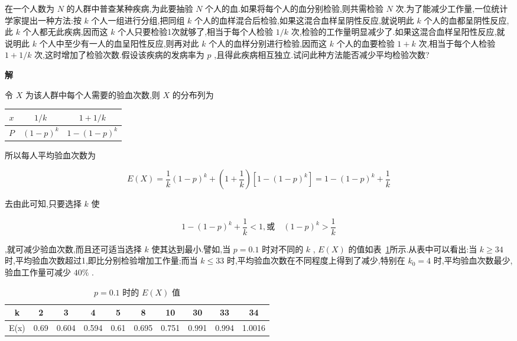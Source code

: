 \begin{example}\label{exam:2.2.2}
	在一个人数为 $ N $ 的人群中普查某种疾病,为此要抽验 $ N $ 个人的血.如果将每个人的血分别检验,则共需检验 $ N $ 次.为了能减少工作量,一位统计学家提出一种方法:按 $ k $ 个人一组进行分组,把同组 $ k $ 个人的血样混合后检验,如果这混合血样呈阴性反应,就说明此 $ k $ 个人的血都呈阴性反应,此 $ k $ 个人都无此疾病,因而这 $ k $ 个人只要检验1次就够了,相当于每个人检验 $ 1/k $ 次,检验的工作量明显减少了.如果这混合血样呈阳性反应,就说明此 $ k $ 个人中至少有一人的血呈阳性反应,则再对此 $ k $ 个人的血样分别进行检验,因而这 $ k $ 个人的血要检验 $ 1+k $ 次,相当于每个人检验 $ 1+1/k $ 次,这时增加了检验次数.假设该疾病的发病率为 $ p $ ,且得此疾病相互独立.试问此种方法能否减少平均检验次数?
	
	\textbf{解}
	
	令 $ X $ 为该人群中每个人需要的验血次数,则 $ X $ 的分布列为
	
	\begin{table}[htbp]
		\centering
		\begin{tabular}{c|cc}
			 $ x $ 	& $ 1 / k $ & $ 1+1 / k $ \\\midrule
			 $ P $ 	& $ (1-p)^{k} $ & $ 1-(1-p)^{k} $ \\
		\end{tabular}%
	\end{table}%
	
\end{example}

所以每人平均验血次数为

\[ 
E(X)=\frac{1}{k}(1-p)^{k}+\left(1+\frac{1}{k}\right)\left[1-(1-p)^{k}\right]=1-(1-p)^{k}+\frac{1}{k}
\]

去由此可知,只要选择 $ k $ 使

\[ 
1-(1-p)^{k}+\frac{1}{k}<1, \text{或} \quad(1-p)^{k}>\frac{1}{k}
\]

,就可减少验血次数,而且还可适当选择 $ k $ 使其达到最小.譬如,当 $ p=0.1 $ 时对不同的 $ k $ , $ E(X) $ 的值如表~\ref{tab:2.21}所示.从表中可以看出:当 $ k \geqslant 34 $ 时,平均验血次数超过1,即比分别检验增加工作量;而当 $ k \leqslant 33 $ 时,平均验血次数在不同程度上得到了减少,特别在 $ k_{0}=4 $ 时,平均验血次数最少,验血工作量可减少 $ 40\% $ .

\begin{table}[htbp]
	\centering
	\caption{ $ p=0.1 $ 时的 $ E(X) $ 值}
	\begin{tabular}{c|ccccccccc}
		\toprule
		k     & 2     & 3     & 4     & 5     & 8     & 10    & 30    & 33    & 34 \\\midrule
		E(x)  & 0.69  & 0.604 & 0.594 & 0.61  & 0.695 & 0.751 & 0.991 & 0.994 & 1.0016 \\\bottomrule
	\end{tabular}%
	\label{tab:2.21}%
\end{table}%


